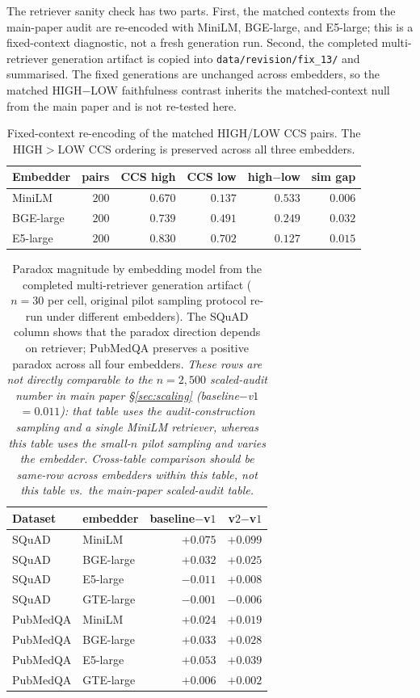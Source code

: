 The retriever sanity check has two parts. First, the matched contexts
from the main-paper audit are re-encoded with MiniLM, BGE-large, and
E5-large; this is a fixed-context diagnostic, not a fresh generation
run. Second, the completed multi-retriever generation artifact is
copied into \texttt{data/revision/fix\_13/} and summarised. The fixed
generations are unchanged across embedders, so the matched
HIGH$-$LOW faithfulness contrast inherits the matched-context null
from the main paper and is not re-tested here.

\begin{table}[!htb]
\centering
\caption{Fixed-context re-encoding of the matched HIGH/LOW CCS pairs.
The HIGH$>$LOW CCS ordering is preserved across all three embedders.}
\footnotesize
\begin{tabular}{lrrrrr}
\toprule
Embedder & pairs & CCS high & CCS low & high$-$low & sim gap \\
\midrule
MiniLM    & $200$ & $0.670$ & $0.137$ & $0.533$ & $0.006$ \\
BGE-large & $200$ & $0.739$ & $0.491$ & $0.249$ & $0.032$ \\
E5-large  & $200$ & $0.830$ & $0.702$ & $0.127$ & $0.015$ \\
\bottomrule
\end{tabular}
\end{table}

\begin{table}[!htb]
\centering
\caption{Paradox magnitude by embedding model from the completed
multi-retriever generation artifact ($n=30$ per cell, original pilot
sampling protocol re-run under different embedders). The SQuAD column
shows that the paradox direction depends on retriever; PubMedQA
preserves a positive paradox across all four embedders.
\textit{These rows are not directly comparable to the $n=2{,}500$
scaled-audit number in main paper \S\ref{sec:scaling}
(baseline$-$v$1$ $= 0.011$):
that table uses the audit-construction sampling and a single MiniLM
retriever, whereas this table uses the small-$n$ pilot sampling and
varies the embedder. Cross-table comparison should be same-row across
embedders within this table, not this table vs.\ the main-paper
scaled-audit table.}}
\footnotesize
\begin{tabular}{llrr}
\toprule
Dataset & embedder & baseline$-$v$1$ & v$2$$-$v$1$ \\
\midrule
SQuAD    & MiniLM    & $+0.075$ & $+0.099$ \\
SQuAD    & BGE-large & $+0.032$ & $+0.025$ \\
SQuAD    & E5-large  & $-0.011$ & $+0.008$ \\
SQuAD    & GTE-large & $-0.001$ & $-0.006$ \\
PubMedQA & MiniLM    & $+0.024$ & $+0.019$ \\
PubMedQA & BGE-large & $+0.033$ & $+0.028$ \\
PubMedQA & E5-large  & $+0.053$ & $+0.039$ \\
PubMedQA & GTE-large & $+0.006$ & $+0.002$ \\
\bottomrule
\end{tabular}
\end{table}

